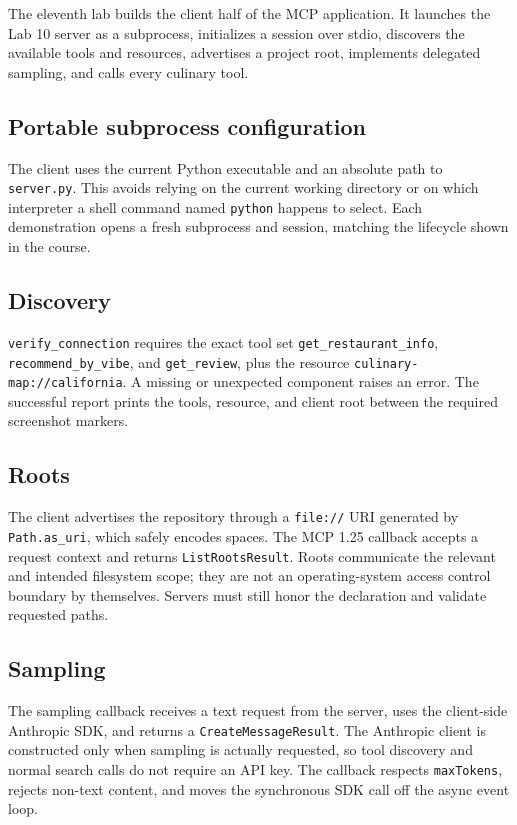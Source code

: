 \documentclass[11pt]{article}
\begin{document}
The eleventh lab builds the client half of the MCP application. It launches the
Lab 10 server as a subprocess, initializes a session over stdio, discovers the
available tools and resources, advertises a project root, implements delegated
sampling, and calls every culinary tool.

\subsection{Portable subprocess configuration}

The client uses the current Python executable and an absolute path to
\texttt{server.py}. This avoids relying on the current working directory or on
which interpreter a shell command named \texttt{python} happens to select.
Each demonstration opens a fresh subprocess and session, matching the lifecycle
shown in the course.

\subsection{Discovery}

\texttt{verify\_connection} requires the exact tool set
\texttt{get\_restaurant\_info}, \texttt{recommend\_by\_vibe}, and
\texttt{get\_review}, plus the resource
\texttt{culinary-map://california}. A missing or unexpected component raises an
error. The successful report prints the tools, resource, and client root between
the required screenshot markers.

\subsection{Roots}

The client advertises the repository through a \texttt{file://} URI generated by
\texttt{Path.as\_uri}, which safely encodes spaces. The MCP 1.25 callback accepts
a request context and returns \texttt{ListRootsResult}. Roots communicate the
relevant and intended filesystem scope; they are not an operating-system access
control boundary by themselves. Servers must still honor the declaration and
validate requested paths.

\subsection{Sampling}

The sampling callback receives a text request from the server, uses the
client-side Anthropic SDK, and returns a \texttt{CreateMessageResult}. The
Anthropic client is constructed only when sampling is actually requested, so
tool discovery and normal search calls do not require an API key. The callback
respects \texttt{maxTokens}, rejects non-text content, and moves the synchronous
SDK call off the async event loop.
\end{document}
